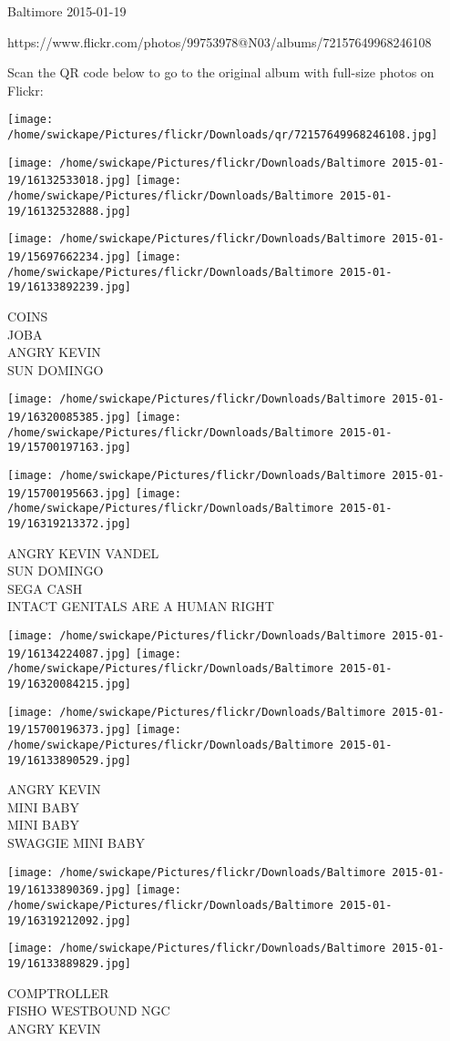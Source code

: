 \documentclass[10pt,letterpaper]{article}
\begin{document}
Baltimore 2015-01-19

https://www.flickr.com/photos/99753978@N03/albums/72157649968246108

Scan the QR code below to go to the original album with full-size photos on Flickr:

\texttt{[image: /home/swickape/Pictures/flickr/Downloads/qr/72157649968246108.jpg]}
\pagebreak

\texttt{[image: /home/swickape/Pictures/flickr/Downloads/Baltimore 2015-01-19/16132533018.jpg]}
\texttt{[image: /home/swickape/Pictures/flickr/Downloads/Baltimore 2015-01-19/16132532888.jpg]}

\texttt{[image: /home/swickape/Pictures/flickr/Downloads/Baltimore 2015-01-19/15697662234.jpg]}
\texttt{[image: /home/swickape/Pictures/flickr/Downloads/Baltimore 2015-01-19/16133892239.jpg]}

COINS\\
JOBA\\
ANGRY KEVIN\\
SUN DOMINGO
\pagebreak

\texttt{[image: /home/swickape/Pictures/flickr/Downloads/Baltimore 2015-01-19/16320085385.jpg]}
\texttt{[image: /home/swickape/Pictures/flickr/Downloads/Baltimore 2015-01-19/15700197163.jpg]}

\texttt{[image: /home/swickape/Pictures/flickr/Downloads/Baltimore 2015-01-19/15700195663.jpg]}
\texttt{[image: /home/swickape/Pictures/flickr/Downloads/Baltimore 2015-01-19/16319213372.jpg]}

ANGRY KEVIN VANDEL\\
SUN DOMINGO\\
SEGA CASH\\
INTACT GENITALS ARE A HUMAN RIGHT
\pagebreak

\texttt{[image: /home/swickape/Pictures/flickr/Downloads/Baltimore 2015-01-19/16134224087.jpg]}
\texttt{[image: /home/swickape/Pictures/flickr/Downloads/Baltimore 2015-01-19/16320084215.jpg]}

\texttt{[image: /home/swickape/Pictures/flickr/Downloads/Baltimore 2015-01-19/15700196373.jpg]}
\texttt{[image: /home/swickape/Pictures/flickr/Downloads/Baltimore 2015-01-19/16133890529.jpg]}

ANGRY KEVIN\\
MINI BABY\\
MINI BABY\\
SWAGGIE MINI BABY
\pagebreak

\texttt{[image: /home/swickape/Pictures/flickr/Downloads/Baltimore 2015-01-19/16133890369.jpg]}
\texttt{[image: /home/swickape/Pictures/flickr/Downloads/Baltimore 2015-01-19/16319212092.jpg]}

\texttt{[image: /home/swickape/Pictures/flickr/Downloads/Baltimore 2015-01-19/16133889829.jpg]}

COMPTROLLER\\
FISHO WESTBOUND NGC\\
ANGRY KEVIN
\pagebreak
\end{document}
